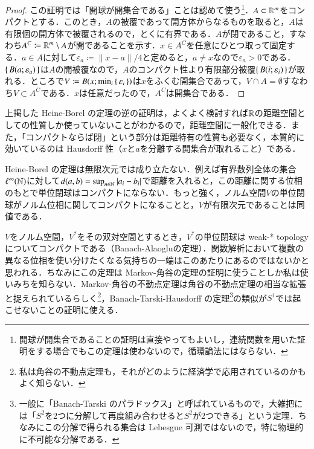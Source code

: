 \begin{proof}
この証明では「開球が開集合である」ことは認めて使う\footnote{開球が開集合であることの証明は直接やってもよいし，連続関数を用いた証明をする場合でもこの定理は使わないので，循環論法にはならない．}．$A \subset \mathbb{R}^m$をコンパクトとする．このとき，$A$の被覆であって開方体からなるものを取ると，$A$は有限個の開方体で被覆されるので，とくに有界である．$A$が閉であること，すなわち$A^C \coloneqq \mathbb{R}^m \setminus A$が開であることを示す．$x \in A^C$を任意にひとつ取って固定する．$a \in A$に対して$\varepsilon_a \coloneqq \|x-a\|/4$と定めると，$a \neq x$なので$\varepsilon_a >0$である．$\set{B(a; \varepsilon_a)}$は$A$の開被覆なので，$A$のコンパクト性より有限部分被覆$\set{B(i; \varepsilon_i)}$が取れる．ところで$V \coloneqq B(x; \min_i \set{\varepsilon_i})$は$x$をふくむ開集合であって，$V \cap A = \emptyset$すなわち$V \subset A^C$である．$x$は任意だったので，$A^C$は開集合である．
\end{proof}

\begin{que}[*]
上掲した Heine-Borel の定理の逆の証明は，よくよく検討すれば$\mathbb{R}$の距離空間としての性質しか使っていないことがわかるので，距離空間に一般化できる．また，「コンパクトならば閉」という部分は距離特有の性質も必要なく，本質的に効いているのは Hausdorff 性（$x$と$a$を分離する開集合が取れること）である．
\end{que}

\begin{que}[*]
Heine-Borel の定理は無限次元では成り立たない．例えば有界数列全体の集合$\ell^\infty(\mathbb{N})$に対して$d(a,b) = \sup_{n \in \mathbb{N}} |a_i - b_i|$で距離を入れると，この距離に関する位相のもとで単位閉球はコンパクトにならない．もっと強く，ノルム空間$V$の単位閉球がノルム位相に関してコンパクトになることと，$V$が有限次元であることは同値である．
\end{que}

\begin{que}[**]
$V$をノルム空間，$V^*$をその双対空間とするとき，$V^*$の単位閉球は weak-* topology についてコンパクトである（Banach-Alaogluの定理）．関数解析において複数の異なる位相を使い分けたくなる気持ちの一端はこのあたりにあるのではないかと思われる．ちなみにこの定理は Markov-角谷の定理の証明に使うことしか私は使いみちを知らない．Markov-角谷の不動点定理は角谷の不動点定理の相当な拡張と捉えられているらしく\footnote{私は角谷の不動点定理も，それがどのように経済学で応用されているのかもよく知らない．}，Banach-Tarski-Hausdorff の定理\footnote{一般に「Banach-Tarski のパラドックス」と呼ばれているもので，大雑把には「$S^2$を2つに分解して再度組み合わせると$S^2$が2つできる」という定理．ちなみにこの分解で得られる集合は Lebesgue 可測ではないので，特に物理的に不可能な分解である．}の類似が$S^1$では起こせないことの証明に使える．
\end{que}

